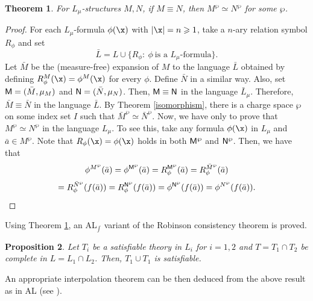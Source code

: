 \documentclass[12pt]{article}
\newtheorem{theorem}{Theorem}[section]
\newtheorem{proposition}[theorem]{Proposition}
\def\a{\bar {a}}\def\b{\bar {b}}\def\c{\bar {c}}
\begin{document}
\begin{theorem}\label{isomorphism charged}
For $L_\mu$-structures $M,N$, if $M\equiv N$, then $M^\wp\simeq N^\wp$ for some $\wp$.
\end{theorem}
\begin{proof}
For each $L_\mu$-formula $\phi(\x)$ with $|\x|=n\geqslant1$, take a $n$-ary relation symbol $R_\phi$
and set $$\bar L=L\cup\{R_\phi:\ \phi\ \textrm{is a $L_\mu$-formula}\}.$$
Let $\bar M$ be the (measure-free) expansion of $M$ to the language $\bar L$ obtained by defining $R^M_\phi(\x)=\phi^M(\x)$ for every $\phi$.
Define $\bar N$ in a similar way. Also, set ${\sf M}=(\bar M,\mu_M)$ and ${\sf N}=(\bar N,\mu_N)$.
Then, ${\sf M}\equiv{\sf N}$ in the language $\bar{L}_\mu$. Therefore, $\bar M\equiv\bar N$ in the language $\bar L$.
By Theorem \ref{isomorphism}, there is a charge space $\wp$ on some index set $I$ such that
$\bar M^\wp\simeq\bar N^\wp$. Now, we have only to prove that $M^\wp\simeq N^\wp$ in the language $L_\mu$.
To see this, take any formula $\phi(\x)$ in $L_\mu$ and $\a\in M^\wp$.
Note that $R_\phi(\x)=\phi(\x)$ holds in both $\sf M^\wp$ and $\sf N^\wp$. Then, we have that
$$\phi^{M^\wp}(\a)=\phi^{{\sf M}^\wp}(\a)=R^{{\sf M}^\wp}_\phi(\a)=R^{{\bar M}^\wp}_\phi(\a)$$
$$=R^{{\bar N}^\wp}_\phi(f(\a))=R^{{\sf N}^\wp}_\phi(f(\a))=\phi^{{\sf N}^\wp}(f(\a))=\phi^{N^\wp}(f(\a)).$$
\end{proof}

Using Theorem \ref{isomorphism charged}, an AL$_{\int}$ variant of the Robinson consistency theorem is proved.

\begin{proposition}
Let $T_i$ be a satisfiable theory in $L_i$ for $i=1,2$ and $T=T_1\cap T_2$ be complete in $L=L_1\cap L_2$.
Then, $T_1\cup T_1$ is satisfiable.
\end{proposition}

An appropriate interpolation theorem can be then deduced from the above result as in AL (see \cite{ACMT}).
\end{document}
